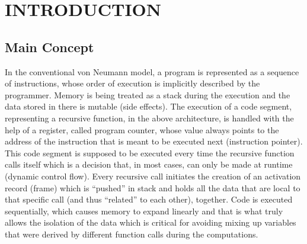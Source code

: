 \documentclass[ack,preface]{dithesis}
\begin{document}
\frontmatter

\mainmatter

\chapter{INTRODUCTION}
    \section{Main Concept}
	In the conventional von Neumann model, a program is represented as a sequence of instructions, whose order of execution is implicitly described by the programmer. Memory is being treated as a stack during the execution and the data stored in there is mutable (side effects). The execution of a code segment, representing a recursive function, in the above architecture, is handled with the help of a register, called program counter, whose value always points to the address of the instruction that is meant to be executed next (instruction pointer). This code segment is supposed to be executed every time the recursive function calls itself which is a decision that, in most cases, can only be made at runtime (dynamic control flow). Every recursive call initiates the creation of an activation record (frame) which is “pushed” in stack and holds all the data that are local to that specific call (and thus “related” to each other), together. Code is executed sequentially, which causes memory to expand linearly and that is what truly allows the isolation of the data which is critical for avoiding mixing up variables that were derived by different function calls during the computations.
\end{document}

